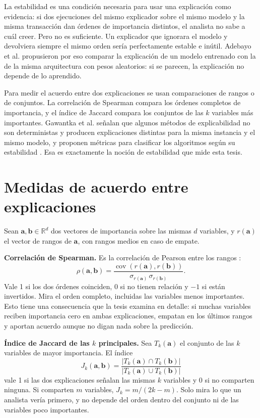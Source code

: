 La estabilidad es una condición necesaria para usar una explicación como evidencia: si dos
ejecuciones del mismo explicador sobre el mismo modelo y la misma transacción dan órdenes de
importancia distintos, el analista no sabe a cuál creer. Pero no es suficiente. Un explicador
que ignorara el modelo y devolviera siempre el mismo orden sería perfectamente estable e
inútil. Adebayo et al. \cite{Adebayo2018Sanity} propusieron por eso comparar la explicación de
un modelo entrenado con la de la misma arquitectura con pesos aleatorios: si se parecen, la
explicación no depende de lo aprendido.

Para medir el acuerdo entre dos explicaciones se usan comparaciones de rangos o de conjuntos.
La correlación de Spearman \cite{Spearman1904} compara los órdenes completos de importancia, y
el índice de Jaccard \cite{Jaccard1912} compara los conjuntos de las $k$ variables más
importantes. Gawantka et al. señalan que algunos métodos de explicabilidad no son deterministas y producen explicaciones distintas para la misma instancia y el mismo modelo, y proponen métricas para clasificar los algoritmos según su estabilidad \cite{Gawantka2024Explanations}. Esa es exactamente la noción de estabilidad que mide esta tesis.

\section{Medidas de acuerdo entre explicaciones}\label{sec:acuerdo}

Sean $\mathbf{a}, \mathbf{b} \in \mathbb{R}^d$ dos vectores de importancia sobre las mismas $d$
variables, y $r(\mathbf{a})$ el vector de rangos de $\mathbf{a}$, con rangos medios en caso de
empate.

\textbf{Correlación de Spearman.} Es la correlación de Pearson entre los rangos
\cite{Spearman1904}:
\begin{equation}
  \rho(\mathbf{a}, \mathbf{b}) = \frac{\operatorname{cov}\left(r(\mathbf{a}), r(\mathbf{b})\right)}
  {\sigma_{r(\mathbf{a})}\,\sigma_{r(\mathbf{b})}}.
\end{equation}
Vale 1 si los dos órdenes coinciden, 0 si no tienen relación y $-1$ si están invertidos. Mira el
orden completo, incluidas las variables menos importantes. Esto tiene una consecuencia que la
tesis examina en detalle: si muchas variables reciben importancia cero en ambas explicaciones,
empatan en los últimos rangos y aportan acuerdo aunque no digan nada sobre la predicción.

\textbf{Índice de Jaccard de las $k$ principales.} Sea $T_k(\mathbf{a})$ el conjunto de las $k$
variables de mayor importancia. El índice \cite{Jaccard1912}
\begin{equation}
  J_k(\mathbf{a}, \mathbf{b}) = \frac{|T_k(\mathbf{a}) \cap T_k(\mathbf{b})|}
  {|T_k(\mathbf{a}) \cup T_k(\mathbf{b})|}
\end{equation}
vale 1 si las dos explicaciones señalan las mismas $k$ variables y 0 si no comparten ninguna. Si
comparten $m$ variables, $J_k = m / (2k - m)$. Solo mira lo que un analista vería primero, y no
depende del orden dentro del conjunto ni de las variables poco importantes.

